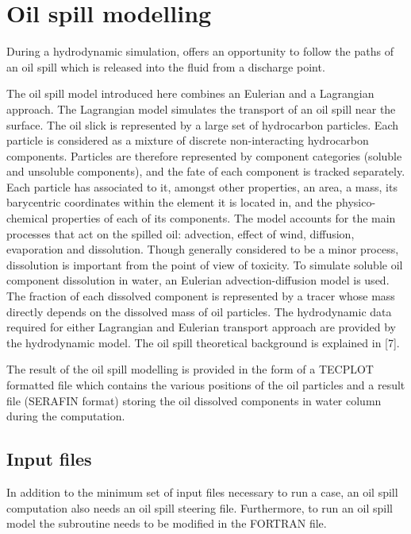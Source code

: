 \chapter{Oil spill modelling}

During a hydrodynamic simulation,  offers an opportunity to follow
the paths of an oil spill which is released into the fluid from a discharge
point.

The oil spill model introduced here combines an Eulerian and a Lagrangian
approach. The Lagrangian model simulates the transport of an oil spill near the
surface. The oil slick is represented by a large set of hydrocarbon particles.
Each particle is considered as a mixture of discrete non-interacting
hydrocarbon components. Particles are therefore represented by component
categories (soluble and unsoluble components), and the fate of each component
is tracked separately. Each particle has associated to it, amongst other
properties, an area, a mass, its barycentric coordinates within the element it
is located in, and the physico-chemical properties of each of its components.
The model accounts for the main processes that act on the spilled oil:
advection, effect of wind, diffusion, evaporation and dissolution. Though
generally considered to be a minor process, dissolution is important from the
point of view of toxicity. To simulate soluble oil component dissolution in
water, an Eulerian advection-diffusion model is used. The fraction of each
dissolved component is represented by a tracer whose mass directly depends on
the dissolved mass of oil particles. The hydrodynamic data required for either
Lagrangian and Eulerian transport approach are provided by the 
hydrodynamic model. The oil spill theoretical background is explained in [7].

The result of the oil spill modelling is provided in the form of a TECPLOT
formatted file which contains the various positions of the oil particles and a
 result file (SERAFIN format) storing the oil dissolved components in
water column during the computation.


\section{Input files}

In addition to the minimum set of input files necessary to run a 
case, an oil spill computation also needs an oil spill steering file.
Furthermore, to run an oil spill model the subroutine  needs
to be modified in the FORTRAN file.


